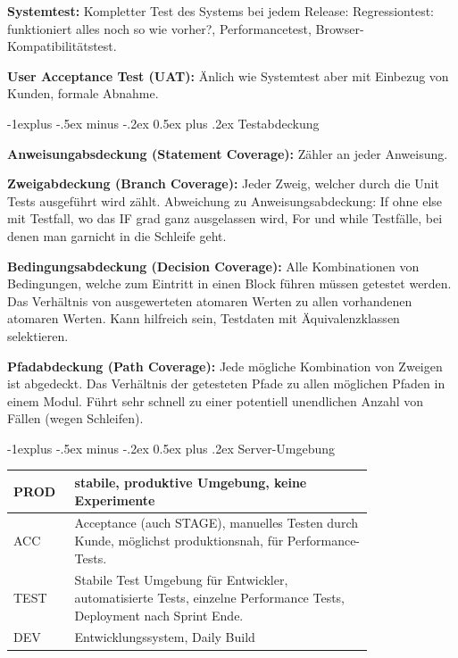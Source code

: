 \documentclass[a4paper, fontsize=6pt]{scrartcl}
\makeatletter
\renewcommand{\subsection}{\@startsection{subsection}{2}{0mm}%
    {-1explus -.5ex minus -.2ex}%
    {0.5ex plus .2ex}%
    {\normalfont\normalsize\bfseries}}
\makeatother
\begin{document}
\begin{multicols*}{5}
\textbf{Systemtest:} Kompletter Test des Systems bei jedem Release: Regressiontest: funktioniert alles noch so wie vorher?, Performancetest, Browser-Kompatibilitätstest. 

\textbf{User Acceptance Test (UAT):} Änlich wie Systemtest aber mit Einbezug von Kunden, formale Abnahme.

\subsection{Testabdeckung}

\textbf{Anweisungabsdeckung (Statement Coverage):} Zähler an jeder Anweisung.

\textbf{Zweigabdeckung (Branch Coverage):} Jeder Zweig, welcher durch die Unit Tests ausgeführt wird zählt. Abweichung zu Anweisungsabdeckung: If ohne else mit Testfall, wo das IF grad ganz ausgelassen wird, For und while Testfälle, bei denen man garnicht in die Schleife geht.

\textbf{Bedingungsabdeckung (Decision Coverage):} Alle Kombinationen von Bedingungen, welche zum Eintritt in einen Block führen müssen getestet werden. Das Verhältnis von ausgewerteten atomaren Werten zu allen vorhandenen atomaren Werten. Kann hilfreich sein, Testdaten mit Äquivalenzklassen selektieren.

\textbf{Pfadabdeckung (Path Coverage):} Jede mögliche Kombination von Zweigen ist abgedeckt. Das Verhältnis der getesteten Pfade zu allen möglichen Pfaden in einem Modul. Führt sehr schnell zu einer potentiell unendlichen Anzahl von Fällen (wegen Schleifen).

\subsection{Server-Umgebung}

\begin{tabular}{|p{0.1\linewidth}|p{0.7\linewidth}|}
 \hline
 PROD & stabile, produktive Umgebung, keine Experimente \\ 
 \hline
 ACC & Acceptance (auch STAGE), manuelles Testen durch Kunde, möglichst produktionsnah, für Performance-Tests. \\ 
 \hline
 TEST & Stabile Test Umgebung für Entwickler, automatisierte Tests, einzelne Performance Tests, Deployment nach Sprint Ende. \\ 
 \hline
 DEV & Entwicklungssystem, Daily Build \\ 
 \hline
\end{tabular}



\end{multicols*}
\end{document}
